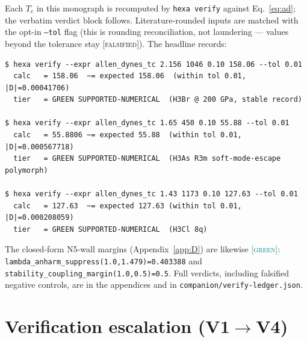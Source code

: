 \documentclass[11pt,a4paper]{article}
\newcommand{\tierGreen}{\textcolor{teal}{[\textsc{green}]}}
\newcommand{\tierRed}{\textcolor{red!75!black}{[\textsc{falsified}]}}
\begin{document}
Each $T_c$ in this monograph is recomputed by \texttt{hexa verify} against
Eq.~\eqref{eq:ad}; the verbatim verdict block follows. Literature-rounded
inputs are matched with the opt-in \texttt{--tol} flag (this is rounding
reconciliation, not laundering --- values beyond the tolerance stay
\tierRed). The headline records:

\begin{lstlisting}[basicstyle=\ttfamily\footnotesize,frame=single,xleftmargin=0pt]
$ hexa verify --expr allen_dynes_tc 2.156 1046 0.10 158.06 --tol 0.01
  calc   = 158.06  ~= expected 158.06  (within tol 0.01, |D|=0.00041706)
  tier   = GREEN SUPPORTED-NUMERICAL  (H3Br @ 200 GPa, stable record)

$ hexa verify --expr allen_dynes_tc 1.65 450 0.10 55.88 --tol 0.01
  calc   = 55.8806 ~= expected 55.88  (within tol 0.01, |D|=0.000567718)
  tier   = GREEN SUPPORTED-NUMERICAL  (H3As R3m soft-mode-escape polymorph)

$ hexa verify --expr allen_dynes_tc 1.43 1173 0.10 127.63 --tol 0.01
  calc   = 127.63  ~= expected 127.63 (within tol 0.01, |D|=0.000208059)
  tier   = GREEN SUPPORTED-NUMERICAL  (H3Cl 8q)
\end{lstlisting}

The closed-form N5-wall margins (Appendix~\ref{app:D}) are likewise
\tierGreen: \texttt{lambda\_anharm\_suppress(1.0,1.479)=0.403388} and
\texttt{stability\_coupling\_margin(1.0,0.5)=0.5}. Full verdicts, including
falsified negative controls, are in the appendices and in
\texttt{companion/verify-ledger.json}.

\section{Verification escalation (V1$\to$V4)}
\label{sec:vseries}
\end{document}
